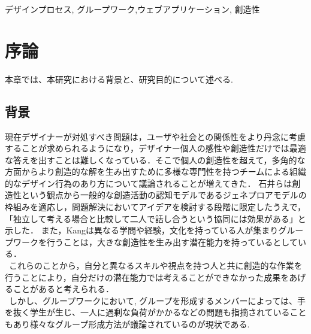\documentclass{funthesis}
\begin{document}
\begin{jkeyword}
デザインプロセス, グループワーク,ウェブアプリケーション, 創造性
\end{jkeyword}

\tableofcontents %


\chapter{序論} %

本章では、本研究における背景と、研究目的について述べる.


\section{背景} %


現在デザイナーが対処すべき問題は，ユーザや社会との関係性をより丹念に考慮することが求められるようになり，デザイナー個人の感性や創造性だけでは最適な答えを出すことは難しくなっている．そこで個人の創造性を超えて，多角的な方面からより創造的な解を生み出すために多様な専門性を持つチームによる組織的なデザイン行為のあり方について議論されることが増えてきた\cite{A1}． 石井らは創造性という観点から一般的な創造活動の認知モデルであるジェネプロアモデルの枠組みを適応し，問題解決においてアイデアを検討する段階に限定したうえで，「独立して考える場合と比較して二人で話し合うという協同には効果がある」と示した\cite{A2}． また，Kangは異なる学問や経験，文化を持っている人が集まりグループワークを行うことは，大きな創造性を生み出す潜在能力を持っている\cite{A3}としている．\\
\ これらのことから，自分と異なるスキルや視点を持つ人と共に創造的な作業を行うことにより，自分だけの潜在能力では考えることができなかった成果をあげることがあると考えられる．\\
\ しかし、グループワークにおいて, グループを形成するメンバーによっては、手を抜く学生が生じ、一人に過剰な負荷がかかるなどの問題も指摘されていることもあり\cite{A4}様々なグループ形成方法が議論されているのが現状である.
\end{document}
